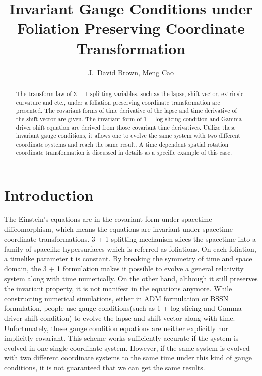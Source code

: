 \documentclass[letterpaper,nofootinbib,prd,amsmath,onecolumn]{revtex4-1}
\begin{document}

\title{Invariant Gauge Conditions under Foliation Preserving Coordinate Transformation}
\author{J.~David Brown, Meng Cao}

\begin{abstract}
The transform law of 3 + 1 splitting variables, such as the lapse, shift vector, extrinsic curvature and etc., under a foliation preserving coordinate transformation are presented. The covariant forms of time derivative of the lapse and time derivative of the shift vector are given. The invariant form of 1 + log slicing condition and Gamma-driver shift equation are derived from those covariant time derivatives. Utilize these invariant gauge conditions, it allows one to evolve the same system with two different coordinate systems and reach the same result. A time dependent spatial rotation coordinate transformation is discussed in details as a specific example of this case.  
\end{abstract}
\maketitle

\section{Introduction}
The Einstein's equations are in the covariant form under spacetime diffeomorphism, which means the equations are invariant under spacetime coordinate transformations. 3 + 1 splitting mechanism slices the spacetime into a family of spacelike hypersurfaces which is referred as foliations. On each foliation, a timelike parameter t is constant. By breaking the symmetry of time and space domain, the 3 + 1 formulation makes it possible to evolve a general relativity system along with time numerically. On the other hand, although it still preserves the invariant property, it is not manifest in the equations anymore. While constructing numerical simulations, either in ADM formulation or BSSN formulation, people use gauge conditions(such as 1 + log slicing and Gamma-driver shift condition) to evolve the lapse and shift vector along with time. Unfortunately, these gauge condition equations are neither explicitly nor implicitly covariant. This scheme works sufficiently accurate if the system is evolved in one single coordinate system. However, if the same system is evolved with two different coordinate systems to the same time under this kind of gauge conditions, it is not guaranteed that we can get the same results. 
\end{document}
